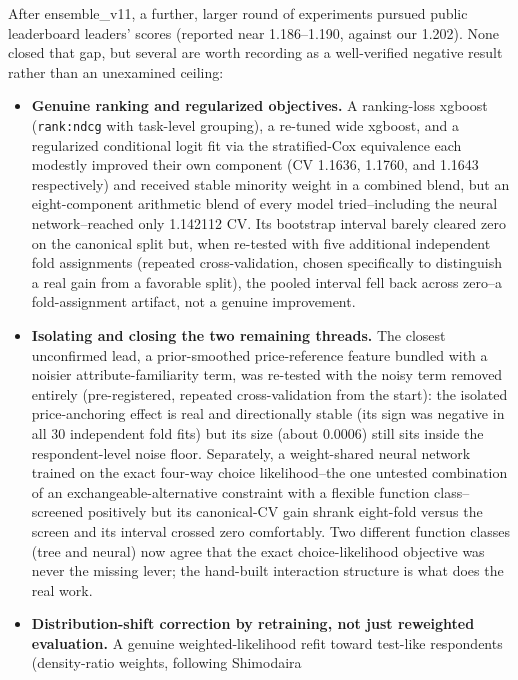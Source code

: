 \documentclass[
  9.5pt,
]{article}
\providecommand{\tightlist}{%
  \setlength{\itemsep}{0pt}\setlength{\parskip}{0pt}}
\begin{document}
After ensemble\_v11, a further, larger round of experiments pursued
public leaderboard leaders' scores (reported near 1.186--1.190, against
our 1.202). None closed that gap, but several are worth recording as a
well-verified negative result rather than an unexamined ceiling:

\begin{itemize}
\tightlist
\item
  \textbf{Genuine ranking and regularized objectives.} A ranking-loss
  xgboost (\texttt{rank:ndcg} with task-level grouping), a re-tuned wide
  xgboost, and a regularized conditional logit fit via the
  stratified-Cox equivalence each modestly improved their own component
  (CV 1.1636, 1.1760, and 1.1643 respectively) and received stable
  minority weight in a combined blend, but an eight-component arithmetic
  blend of every model tried--including the neural network--reached only
  1.142112 CV. Its bootstrap interval barely cleared zero on the
  canonical split but, when re-tested with five additional independent
  fold assignments (repeated cross-validation, chosen specifically to
  distinguish a real gain from a favorable split), the pooled interval
  fell back across zero--a fold-assignment artifact, not a genuine
  improvement.
\item
  \textbf{Isolating and closing the two remaining threads.} The closest
  unconfirmed lead, a prior-smoothed price-reference feature bundled
  with a noisier attribute-familiarity term, was re-tested with the
  noisy term removed entirely (pre-registered, repeated cross-validation
  from the start): the isolated price-anchoring effect is real and
  directionally stable (its sign was negative in all 30 independent fold
  fits) but its size (about 0.0006) still sits inside the
  respondent-level noise floor. Separately, a weight-shared neural
  network trained on the exact four-way choice likelihood--the one
  untested combination of an exchangeable-alternative constraint with a
  flexible function class--screened positively but its canonical-CV gain
  shrank eight-fold versus the screen and its interval crossed zero
  comfortably. Two different function classes (tree and neural) now
  agree that the exact choice-likelihood objective was never the missing
  lever; the hand-built interaction structure is what does the real
  work.
\item
  \textbf{Distribution-shift correction by retraining, not just
  reweighted evaluation.} A genuine weighted-likelihood refit toward
  test-like respondents (density-ratio weights, following Shimodaira

\end{itemize}
\end{document}
